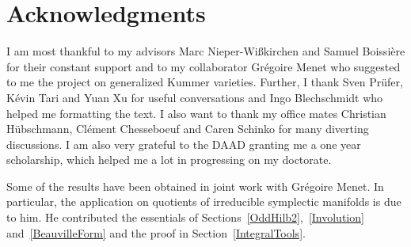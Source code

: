 \documentclass[11pt,twoside]{article}
\begin{document}




\section*{Acknowledgments}
I am most thankful to my advisors Marc Nieper-Wi\ss\-kir\-chen and Samuel Boissi\`ere for their constant support
and to my collaborator Gr\'egoire Menet who suggested to me the project on generalized Kummer varieties.
Further, I thank Sven Pr\"ufer, K\'evin Tari and Yuan Xu for useful conversations and
Ingo Blechschmidt who helped me formatting the text.
I also want to thank my office mates Christian H\"ubschmann, Cl\'ement Chesseboeuf and Caren Schinko for many diverting discussions.
I am also very grateful to the DAAD granting me a one year scholarship, which helped me a lot in progressing on my doctorate. 

Some of the results have been obtained in joint work with Gr\'egoire Menet. In particular, the application on quotients of irreducible symplectic manifolds is due to him.
He contributed the essentials of Sections~\ref{OddHilb2},~\ref{Involution} and~\ref{BeauvilleForm} and the proof in Section~\ref{IntegralTools}.


\cleardoublepage

\tableofcontents

\cleardoublepage


\pagestyle{fancy}


\end{document}
